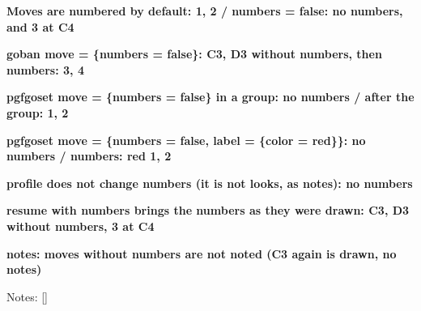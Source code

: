 \documentclass{article}
\newcommand\case[1]{\par\medskip\noindent\textbf{#1}\par\nopagebreak}
\begin{document}
\case{Moves are numbered by default: 1, 2 / numbers = false: no numbers, and 3 at C4}
\begin{goban}[5]\end{goban}
\begin{goban}[5]\end{goban}

\case{goban move = \{numbers = false\}: C3, D3 without numbers, then numbers: 3, 4}
\begin{goban}[5, move = {numbers = false}]\end{goban}

\case{pgfgoset move = \{numbers = false\} in a group: no numbers / after the group: 1, 2}
{\begin{goban}[5]\end{goban}}
\begin{goban}[5]\end{goban}

\case{pgfgoset move = \{numbers = false, label = \{color = red\}\}: no numbers / numbers: red 1, 2}
{
\begin{goban}[5]\end{goban}
\begin{goban}[5]\end{goban}}

\case{profile does not change numbers (it is not looks, as notes): no numbers}
{\begin{goban}[5, profile = default]\end{goban}}

\case{resume with numbers brings the numbers as they were drawn: C3, D3 without numbers, 3 at C4}
\begin{goban}[5, name = a]\end{goban}
\begin{goban}[5, resume = {a, numbers}]\end{goban}

\case{notes: moves without numbers are not noted (C3 again is drawn, no notes)}
\begin{goban}[5, notes, move = {numbers = false}]\end{goban}
\par\noindent Notes: [\pgfgomovenotes]
\end{document}
